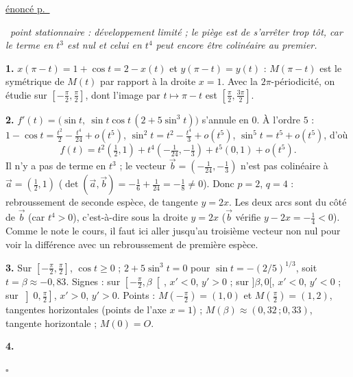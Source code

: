 \documentclass[a4paper,11pt]{article}
\numberwithin{equation}{section}
\numberwithin{figure}{section}
\numberwithin{table}{section}
\theoremstyle{enonce}
\theoremstyle{exemple}
\theoremstyle{remarque}
\newenvironment{corrige}[1]{%
  \par\needspace{6\baselineskip}\vspace{1em}\phantomsection\label{c:#1}%
  \noindent{\sffamily\bfseries\color{Bleu}Exercice~\ref{e:#1}}\quad
  {\scriptsize\sffamily\hyperref[e:#1]{\color{Gris}énoncé p.~\pageref{e:#1}}}\par\nobreak\vspace{0.2em}}%
  {\hfill\textcolor{BleuClair}{$\square$}\par}
\newcommand{\ve}[1]{\vec{#1}}
\newcommand{\demarche}[1]{\noindent{\sffamily\bfseries\small\color{BleuMoyen}Démarche.}\ \textit{#1}\par\smallskip}
\begin{document}
\begin{corrige}{bicorne2}
\demarche{point stationnaire : développement limité ; le piège est de s'arrêter trop tôt, car le terme en $t^3$ est nul et celui en $t^4$ peut encore être colinéaire au premier.}
\textbf{1.} $x(\pi-t)=1+\cos t=2-x(t)$ et $y(\pi-t)=y(t)$ : $M(\pi-t)$ est le symétrique de $M(t)$ par rapport à la droite
$x=1$. Avec la $2\pi$-périodicité, on étudie sur $\left[-\frac\pi2,\frac\pi2\right]$, dont l'image par $t\mapsto\pi-t$ est
$\left[\frac\pi2,\frac{3\pi}2\right]$.

\textbf{2.} $f'(t)=\big(\sin t,\ \sin t\cos t\,(2+5\sin^3t)\big)$ s'annule en $0$. À l'ordre $5$ :
$1-\cos t=\frac{t^2}2-\frac{t^4}{24}+o(t^5)$, $\sin^2t=t^2-\frac{t^4}3+o(t^5)$, $\sin^5t=t^5+o(t^5)$, d'où
\[f(t)=t^2\left(\tfrac12,1\right)+t^4\left(-\tfrac1{24},-\tfrac13\right)+t^5(0,1)+o(t^5).\]
Il n'y a pas de terme en $t^3$ ; le vecteur $\ve b=\left(-\frac1{24},-\frac13\right)$ n'est pas colinéaire à
$\ve a=\left(\frac12,1\right)$ ($\det(\ve a,\ve b)=-\frac16+\frac1{24}=-\frac18\neq0$). Donc $p=2$, $q=4$ : rebroussement de
seconde espèce, de tangente $y=2x$. Les deux arcs sont du côté de $\ve b$ (car $t^4>0$), c'est-à-dire sous la droite
$y=2x$ ($\ve b$ vérifie $y-2x=-\frac14<0$). Comme le note le cours, il faut ici aller jusqu'au troisième vecteur non nul
pour voir la différence avec un rebroussement de première espèce.

\textbf{3.} Sur $\left[-\frac\pi2,\frac\pi2\right]$, $\cos t\geq0$ ; $2+5\sin^3t=0$ pour $\sin t=-(2/5)^{1/3}$, soit
$t=\beta\approx-0{,}83$. Signes : sur $\left[-\frac\pi2,\beta\right[$, $x'<0$, $y'>0$ ; sur $]\beta,0[$, $x'<0$, $y'<0$ ; sur
$\left]0,\frac\pi2\right]$, $x'>0$, $y'>0$. Points : $M\left(-\frac\pi2\right)=(1,0)$ et $M\left(\frac\pi2\right)=(1,2)$, tangentes
horizontales (points de l'axe $x=1$) ; $M(\beta)\approx(0{,}32\,;0{,}33)$, tangente horizontale ; $M(0)=O$.

\textbf{4.}
\begin{center}
\end{center}
\end{corrige}
\end{document}
